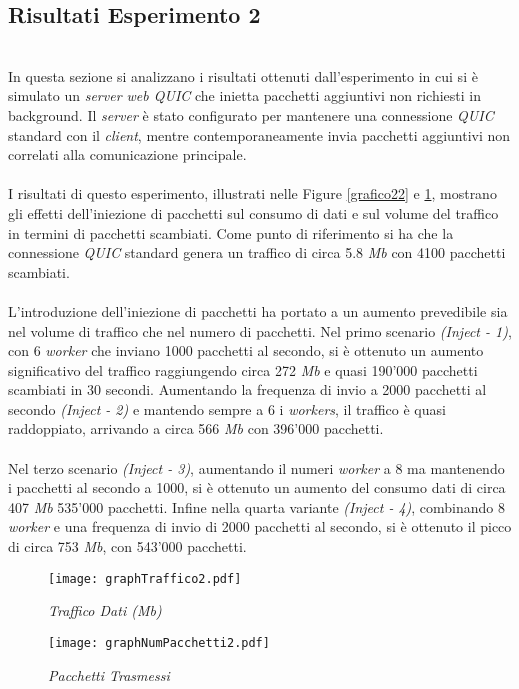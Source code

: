 \subsection{Risultati Esperimento 2}
~\\
\indent In questa sezione si analizzano i risultati ottenuti dall'esperimento in cui si è simulato un \emph{server web QUIC} che inietta pacchetti aggiuntivi non richiesti in background.
Il \emph{server} è stato configurato per mantenere una connessione \emph{QUIC} standard con il \emph{client}, mentre contemporaneamente invia pacchetti aggiuntivi non correlati alla comunicazione principale.
\\\\
I risultati di questo esperimento, illustrati nelle Figure \ref{grafico22} e \ref{grafico2}, mostrano gli effetti dell'iniezione di pacchetti sul consumo di dati e sul volume del traffico in termini di pacchetti scambiati.
Come punto di riferimento si ha che la connessione \emph{QUIC} standard genera un traffico di circa 5.8 \emph{Mb} con 4100 pacchetti scambiati.
\\\\
L'introduzione dell'iniezione di pacchetti ha portato a un aumento prevedibile sia nel volume di traffico che nel numero di pacchetti.
Nel primo scenario \emph{(Inject - 1)}, con 6 \emph{worker} che inviano 1000 pacchetti al secondo, si è ottenuto un aumento significativo del traffico raggiungendo circa 272 \emph{Mb} e quasi 190'000 pacchetti scambiati in 30 secondi. 
Aumentando la frequenza di invio a 2000 pacchetti al secondo \emph{(Inject - 2)} e mantendo sempre a 6 i \emph{workers}, il traffico è quasi raddoppiato, arrivando a circa 566 \emph{Mb} con 396'000 pacchetti.
\\\\
Nel terzo scenario \emph{(Inject - 3)}, aumentando il numeri \emph{worker} a 8 ma mantenendo i pacchetti al secondo a 1000, si è ottenuto un aumento del consumo dati di circa 407 \emph{Mb} 535'000 pacchetti. 
Infine nella quarta variante \emph{(Inject - 4)}, combinando 8 \emph{worker} e una frequenza di invio di 2000 pacchetti al secondo, si è ottenuto il picco di circa 753 \emph{Mb}, con 543'000 pacchetti.
\begin{figure}[!h]
    \centering
    \begin{minipage}{0.48\textwidth}
        \centering
        \texttt{[image: graphTraffico2.pdf]}
        \caption{\emph{Traffico Dati (Mb)}}
        \label{grafico22}
    \end{minipage}
    \hfill
    \begin{minipage}{0.48\textwidth}
        \centering
        \texttt{[image: graphNumPacchetti2.pdf]}
        \caption{\emph{Pacchetti Trasmessi}}
        \label{grafico2}
    \end{minipage}
\end{figure}
